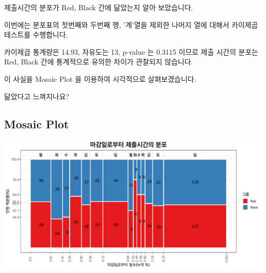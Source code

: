 \documentclass[
]{book}
\begin{document}
제출시간의 분포가 Red, Black 간에 닮았는지 알아 보았습니다.

이번에는 분포표의 첫번째와 두번째 행, '계'열을 제외한 나머지 열에 대해서 카이제곱테스트를 수행합니다.

카이제곱 통계량은 14.93, 자유도는 13, p-value 는 0.3115 이므로 제출 시간의 분포는 Red, Black 간에 통계적으로 유의한 차이가 관찰되지 않습니다.

이 사실을 Mosaic Plot 을 이용하여 시각적으로 살펴보겠습니다.

닮았다고 느껴지나요?

\subsection{Mosaic Plot}\label{mosaic-plot-30}

\includegraphics{Quiz_report_2025_files/figure-latex/unnamed-chunk-414-1.pdf}
\end{document}
